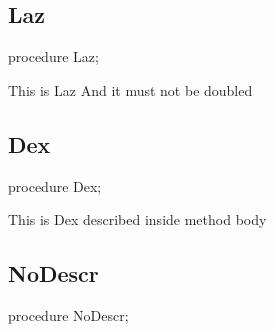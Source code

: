 \documentclass{report}
\begin{document}
\subsection*{Laz}
\begin{list}{}{
\setlength{\itemindent}{0cm}
\setlength{\listparindent}{0cm}
\setlength{\leftmargin}{\evensidemargin}
\addtolength{\leftmargin}{\tmplength}
\settowidth{\labelsep}{X}
\addtolength{\leftmargin}{\labelsep}
\setlength{\labelwidth}{\tmplength}
}
\begin{flushleft}
\item[\textbf{Declaration}\hfill]
\begin{ttfamily}
procedure Laz;\end{ttfamily}


\end{flushleft}
\par
\item[\textbf{Description}]
This is Laz And it must not be doubled

\end{list}
\subsection*{Dex}
\begin{list}{}{
\setlength{\itemindent}{0cm}
\setlength{\listparindent}{0cm}
\setlength{\leftmargin}{\evensidemargin}
\addtolength{\leftmargin}{\tmplength}
\settowidth{\labelsep}{X}
\addtolength{\leftmargin}{\labelsep}
\setlength{\labelwidth}{\tmplength}
}
\begin{flushleft}
\item[\textbf{Declaration}\hfill]
\begin{ttfamily}
procedure Dex;\end{ttfamily}


\end{flushleft}
\par
\item[\textbf{Description}]
This is Dex described inside method body

\end{list}
\subsection*{NoDescr}
\begin{list}{}{
\setlength{\itemindent}{0cm}
\setlength{\listparindent}{0cm}
\setlength{\leftmargin}{\evensidemargin}
\addtolength{\leftmargin}{\tmplength}
\settowidth{\labelsep}{X}
\addtolength{\leftmargin}{\labelsep}
\setlength{\labelwidth}{\tmplength}
}
\begin{flushleft}
\item[\textbf{Declaration}\hfill]
\begin{ttfamily}
procedure NoDescr;\end{ttfamily}


\end{flushleft}
\end{list}
\end{document}
